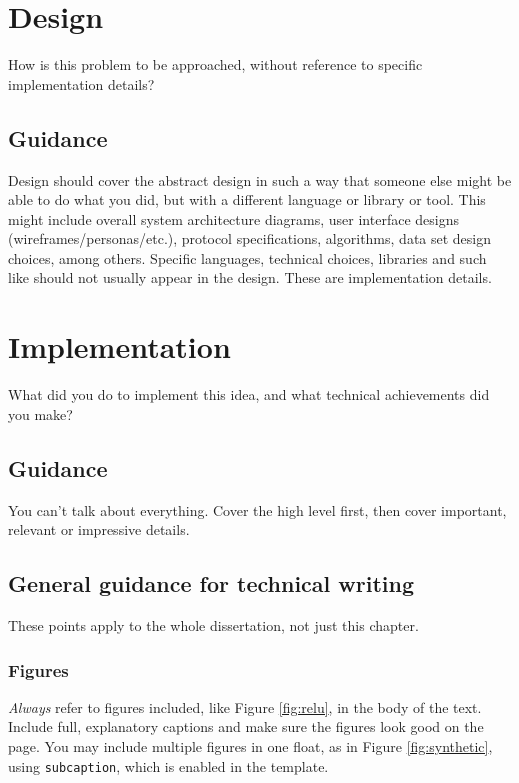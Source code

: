 \documentclass{l4proj}
\begin{document}
\chapter{Design}
How is this problem to be approached, without reference to specific implementation details? 
\section{Guidance}
Design should cover the abstract design in such a way that someone else might be able to do what you did, 
but with a different language or library or tool. This might include overall system architecture diagrams,
user interface designs (wireframes/personas/etc.), protocol specifications, algorithms, data set design choices,
among others. Specific languages, technical choices, libraries and such like should not usually appear in the design. These are implementation details.


\chapter{Implementation}
What did you do to implement this idea, and what technical achievements did you make?
\section{Guidance}
You can't talk about everything. Cover the high level first, then cover important, relevant or impressive details.

\section{General guidance for technical writing}

These points apply to the whole dissertation, not just this chapter.

\subsection{Figures}
\emph{Always} refer to figures included, like Figure \ref{fig:relu}, in the body of the text. Include full, explanatory captions and make sure the figures look good on the page.
You may include multiple figures in one float, as in Figure \ref{fig:synthetic}, using \texttt{subcaption}, which is enabled in the template.
\end{document}
